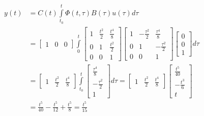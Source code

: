 \documentclass[twoside]{article}
\begin{document}
\begin{align*}
	y(t) &= C(t) \int\limits_{t_0}^{t} \Phi(t , \tau) B(\tau) u(\tau) d\tau 
	\\
	&= \begin{bmatrix} 1 & 0 & 0 \end{bmatrix}  \int\limits_{0}^{t} \begin{bmatrix} 1 & \frac{t^2}{2} & \frac{t^4}{8} \\ 0 & 1 & \frac{t^2}{2} \\ 0 & 0 & 1 \end{bmatrix} 
	\begin{bmatrix} 1 & -\frac{\tau^2}{2} & \frac{\tau^4}{8}  \\ 0 & 1 & -\frac{\tau^2}{2} \\ 0 & 0 & 1 \end{bmatrix} \begin{bmatrix} 0 \\ 0 \\ 1 \end{bmatrix}  d\tau 
	\\
	&= \begin{bmatrix} 1 & \frac{t^2}{2} & \frac{t^4}{8} \end{bmatrix}  \int\limits_{t_0}^{t} \begin{bmatrix} \frac{\tau^4}{8} \\ -\frac{\tau^2}{2} \\ 1 \end{bmatrix} d\tau 
	= \begin{bmatrix} 1 & \frac{t^2}{2} & \frac{t^4}{8} \end{bmatrix} \begin{bmatrix} \frac{t^5}{40} \\ -\frac{t^3}{6} \\ t \end{bmatrix} 
	\\
	&= \frac{t^5}{40} - \frac{t^5}{12} + \frac{t^5}{8} = \frac{t^5}{15}
\end{align*}
%


\end{document}
